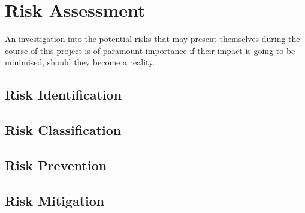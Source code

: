 \section{Risk Assessment}

An investigation into the potential risks that may present themselves during the course of this project is of paramount importance if their impact is going to be minimised, should they become a reality.

\subsection{Risk Identification}

\subsection{Risk Classification}

\subsection{Risk Prevention}

\subsection{Risk Mitigation}